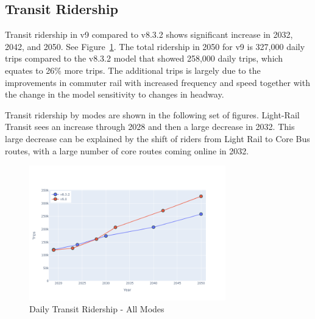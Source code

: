 \documentclass[
  letterpaper,
  DIV=11,
  numbers=noendperiod]{scrreprt}
\begin{document}
\hypertarget{transit-ridership}{%
\subsection{Transit Ridership}\label{transit-ridership}}

Transit ridership in v9 compared to v8.3.2 shows significant increase in
2032, 2042, and 2050. See Figure~\ref{fig-pdf-hy-tr-all}. The total
ridership in 2050 for v9 is 327,000 daily trips compared to the v8.3.2
model that showed 258,000 daily trips, which equates to 26\% more trips.
The additional trips is largely due to the improvements in commuter rail
with increased frequency and speed together with the change in the model
sensitivity to changes in headway.

Transit ridership by modes are shown in the following set of figures.
Light-Rail Transit sees an increase through 2028 and then a large
decrease in 2032. This large decrease can be explained by the shift of
riders from Light Rail to Core Bus routes, with a large number of core
routes coming online in 2032.

\begin{figure}[H]

{\centering \includegraphics[width=0.76\textwidth,height=\textheight]{v9x/v900/whats-new/_pictures/pdf-hy-tr-all.png}

}

\caption{\label{fig-pdf-hy-tr-all}Daily Transit Ridership - All Modes}

\end{figure}
\end{document}

